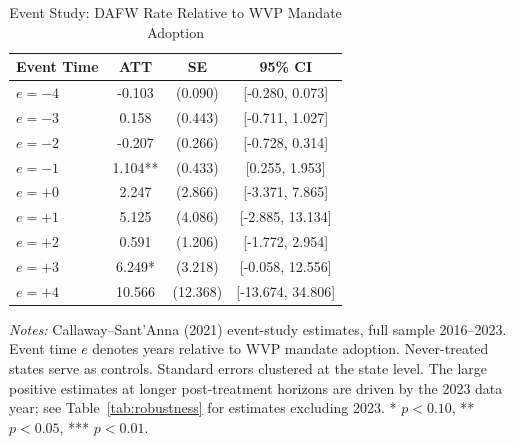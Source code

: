 \begin{table}[htbp]
\centering
\caption{Event Study: DAFW Rate Relative to WVP Mandate Adoption}
\label{tab:eventstudy}
\begin{tabular}{lccc}
\toprule
Event Time & ATT & SE & 95\% CI \\
\midrule
$e = -4$ & -0.103 & (0.090) & [-0.280, 0.073] \\
$e = -3$ & 0.158 & (0.443) & [-0.711, 1.027] \\
$e = -2$ & -0.207 & (0.266) & [-0.728, 0.314] \\
$e = -1$ & 1.104** & (0.433) & [0.255, 1.953] \\
$e = +0$ & 2.247 & (2.866) & [-3.371, 7.865] \\
$e = +1$ & 5.125 & (4.086) & [-2.885, 13.134] \\
$e = +2$ & 0.591 & (1.206) & [-1.772, 2.954] \\
$e = +3$ & 6.249* & (3.218) & [-0.058, 12.556] \\
$e = +4$ & 10.566 & (12.368) & [-13.674, 34.806] \\
\bottomrule
\end{tabular}
\begin{tablenotes}[flushleft]
\small
\item \textit{Notes:} Callaway--Sant'Anna (2021) event-study estimates, full sample 2016--2023. Event time $e$ denotes years relative to WVP mandate adoption. Never-treated states serve as controls. Standard errors clustered at the state level. The large positive estimates at longer post-treatment horizons are driven by the 2023 data year; see Table~\ref{tab:robustness} for estimates excluding 2023. * $p<0.10$, ** $p<0.05$, *** $p<0.01$.
\end{tablenotes}
\end{table}
